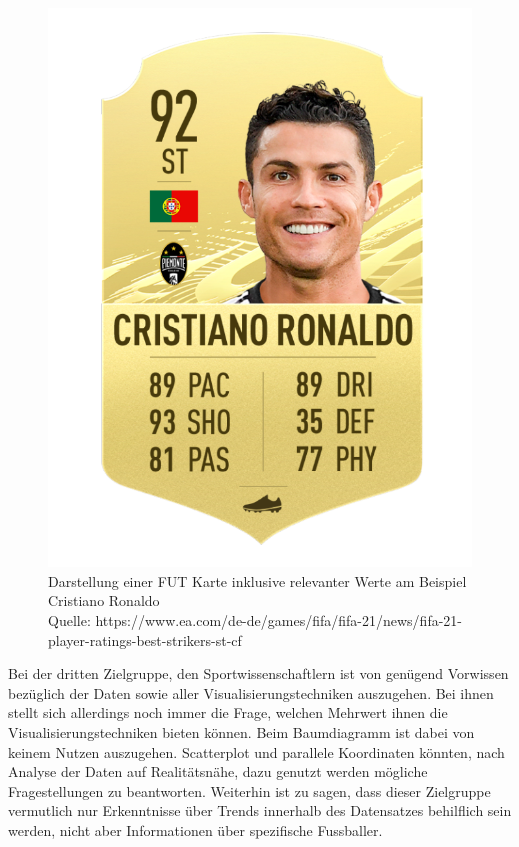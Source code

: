 \documentclass[usegeometry=true]{scrartcl}
\begin{document}
\begin{figure}
\centering
\includegraphics[scale=0.15]{grafiken/Ronaldo}
\caption{Darstellung einer FUT Karte inklusive relevanter Werte am Beispiel Cristiano Ronaldo\\ Quelle: https://www.ea.com/de-de/games/fifa/fifa-21/news/fifa-21-player-ratings-best-strikers-st-cf}
\label{Ronaldo}
\end{figure}

Bei der dritten Zielgruppe, den Sportwissenschaftlern ist von genügend Vorwissen bezüglich der Daten sowie aller Visualisierungstechniken auszugehen. Bei ihnen stellt sich allerdings noch immer die Frage, welchen Mehrwert ihnen die Visualisierungstechniken bieten können. Beim Baumdiagramm ist dabei von keinem Nutzen auszugehen. Scatterplot und parallele Koordinaten könnten, nach Analyse der Daten auf Realitätsnähe, dazu genutzt werden mögliche Fragestellungen zu beantworten. Weiterhin ist zu sagen, dass dieser Zielgruppe vermutlich nur Erkenntnisse über Trends innerhalb des Datensatzes behilflich sein werden, nicht aber Informationen über spezifische Fussballer.\\
\end{document}
